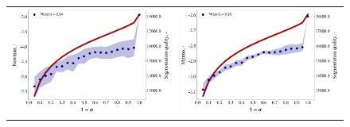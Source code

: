 \begin{figure}
\begin{tabular}{cc}
    \includegraphics[width=70mm]{images/segm_mimno.png} &   \includegraphics[width=70mm]{images/segm_newman.png} \\
 

\end{tabular}
\end{figure}
